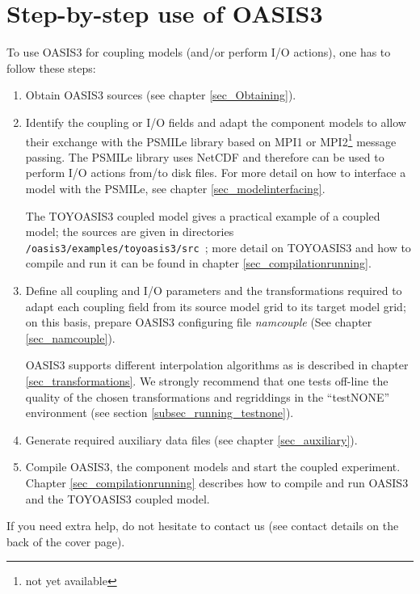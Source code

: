 

\section{Step-by-step use of OASIS3}

To use OASIS3 for coupling models (and/or perform I/O
actions), one has to follow these steps:
\begin{enumerate}
\item Obtain OASIS3 sources (see chapter \ref{sec_Obtaining}).
\item Identify the coupling or I/O fields and adapt the component
  models to allow their exchange with the PSMILe library based on MPI1
  or MPI2\footnote{not yet available} message passing.
  The PSMILe library uses NetCDF and therefore can be used to perform I/O actions
  from/to disk files.  For more detail on how to interface a model
  with the PSMILe, see chapter \ref{sec_modelinterfacing}.

The TOYOASIS3 coupled model gives a practical example of a coupled
model; the sources are given in directories {\tt
  /oasis3/examples/toyoasis3/src }; more detail on TOYOASIS3 and
how to compile and run it can be found in chapter
\ref{sec_compilationrunning}.

\item Define all coupling and I/O parameters and the transformations
  required to adapt each coupling field from its source model grid to
  its target model grid; on this basis, prepare OASIS3 configuring file {\it
  namcouple} (See chapter \ref{sec_namcouple}). 
  
  OASIS3 supports different interpolation algorithms as is described in
  chapter \ref{sec_transformations}. We strongly recommend that one tests off-line the quality
  of the chosen transformations and regriddings in the ``testNONE'' environment (see section \ref{subsec_running_testnone}).

\item Generate required auxiliary data files (see chapter
  \ref{sec_auxiliary}).
\item Compile OASIS3, the component models and start the coupled
  experiment. Chapter \ref{sec_compilationrunning} describes how to
  compile and run OASIS3 and the TOYOASIS3 coupled model.

\end{enumerate}

If you need extra help, do not hesitate to contact us (see contact
details on the back of the cover page).

